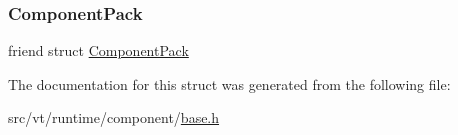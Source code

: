 \subsubsection{\texorpdfstring{Component\+Pack}{ComponentPack}}
{\footnotesize\ttfamily friend struct \hyperlink{structvt_1_1runtime_1_1component_1_1_component_pack}{Component\+Pack}\hspace{0.3cm}{\ttfamily [friend]}}



The documentation for this struct was generated from the following file\+:\begin{DoxyCompactItemize}
\item 
src/vt/runtime/component/\hyperlink{src_2vt_2runtime_2component_2base_8h}{base.\+h}\end{DoxyCompactItemize}
